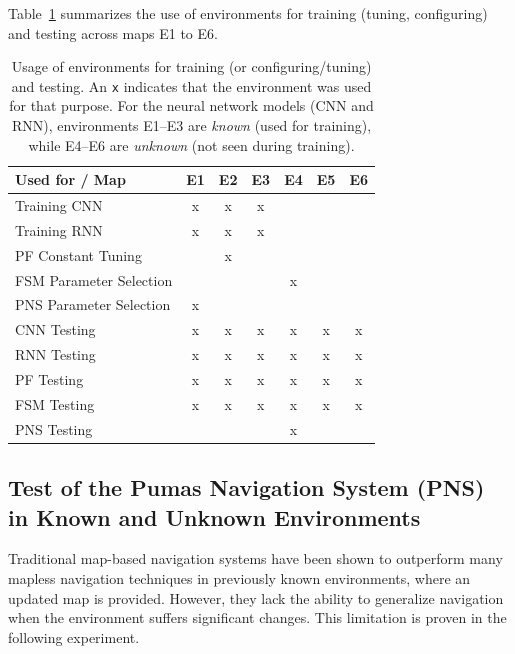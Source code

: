 \documentclass[robotics,article,submit,pdftex,moreauthors]{Definitions/mdpi}
\begin{document}
Table~\ref{tab:map_tasks} summarizes the use of environments for training (tuning, configuring) and testing across maps E1 to E6.

\begin{table}[htbp]
\centering
\begin{tabular}{|l|c|c|c|c|c|c|}
\hline
\textbf{Used for / Map} & \textbf{E1} & \textbf{E2} & \textbf{E3} & \textbf{E4} & \textbf{E5} & \textbf{E6} \\
\hline
Training CNN               &  x  &  x  &  x  &     &     &     \\
\hline
Training RNN               &  x  &  x  &  x  &     &     &     \\
\hline
PF Constant Tuning         &     &  x  &     &     &     &     \\
\hline
FSM Parameter Selection    &     &     &     &  x  &     &     \\
\hline
PNS Parameter Selection &  x  &     &     &     &     &     \\
\hline
CNN Testing                &  x  &  x  &  x  &  x  &  x  &  x  \\
\hline
RNN Testing                &  x  &  x  &  x  &  x  &  x  &  x  \\
\hline
PF Testing                 &  x  &  x  &  x  &  x  &  x  &  x  \\
\hline
FSM Testing                &  x  &  x  &  x  &  x  &  x  &  x  \\
\hline
PNS Testing          &     &     &     &  x  &     &     \\
\hline
\end{tabular}
\vspace{2.5pt}
\caption{Usage of environments for training (or configuring/tuning) and testing. An \texttt{x} indicates that the environment was used for that purpose. For the neural network models (CNN and RNN), environments E1–E3 are \textit{known} (used for training), while E4–E6 are \textit{unknown} (not seen during training).}
\label{tab:map_tasks}
\end{table}

\subsection{Test of the Pumas Navigation System (PNS) in Known and Unknown Environments}

Traditional map-based navigation systems have been shown to outperform many mapless navigation techniques in previously known environments, where an updated map is provided. However, they lack the ability to generalize navigation when the environment suffers significant changes. This limitation is proven in the following experiment.
\end{document}
